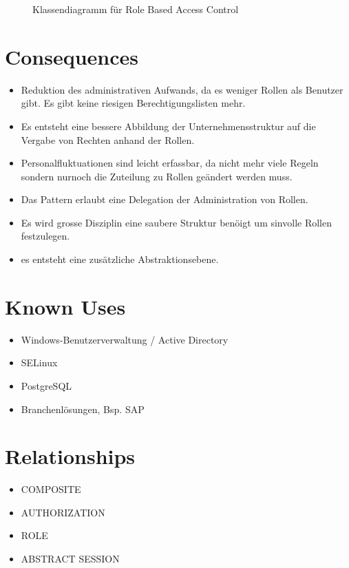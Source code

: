 \begin{figure}[!ht]
  \centering
  
  \caption{Klassendiagramm f\"ur Role Based Access Control}
\end{figure}

\section{Consequences}

\begin{itemize}
  \item Reduktion des administrativen Aufwands, da es weniger Rollen als Benutzer gibt. Es gibt keine riesigen Berechtigungslisten mehr.
  \item Es entsteht eine bessere Abbildung der Unternehmensstruktur auf die Vergabe von Rechten anhand der Rollen.
  \item Personalfluktuationen sind leicht erfassbar, da nicht mehr viele Regeln sondern nurnoch die Zuteilung zu Rollen geändert werden muss.
  \item Das Pattern erlaubt eine Delegation der Administration von Rollen.
  \item Es wird grosse Disziplin eine saubere Struktur benöigt um sinvolle Rollen festzulegen.
  \item es entsteht eine zusätzliche Abstraktionsebene.
\end{itemize}

\section{Known Uses}
\begin{itemize}
\item Windows-Benutzerverwaltung / Active Directory
\item SELinux
\item PostgreSQL
\item Branchenlösungen, Bsp. SAP
\end{itemize}

\section{Relationships}
\begin{itemize}
  \item COMPOSITE
  \item AUTHORIZATION
  \item ROLE
  \item ABSTRACT SESSION
\end{itemize}

